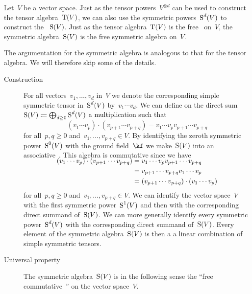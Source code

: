 \begin{recall}
	Let~$V$ be a vector space.
	Just as the tensor powers~$V^{\otimes d}$ can be used to construct the tensor algebra~$\operatorname{T}(V)$, we can also use the symmetric powers~$\operatorname{S}^d(V)$ to construct the ~$\operatorname{S}(V)$.
	Just as the tensor algebra~$\operatorname{T}(V)$ is the free~\algebra{$\kf$} on~$V$, the symmetric algebra~$\operatorname{S}(V)$ is the free symmetric algebra on~$V$.

	The argumentation for the symmetric algebra is analogous to that for the tensor algebra.
	We will therefore skip some of the details.
	
	\begin{description}
		\item[Construction]
			For all vectors~$v_1, \dotsc, v_d$ in~$V$ we denote the corresponding simple symmetric tensor in~$\operatorname{S}^d(V)$ by~$v_1 \dotsm v_d$.
			We can define on the direct sum~$\operatorname{S}(V) \coloneqq \bigoplus_{d \geq 0} \operatorname{S}^d(V)$ a multiplication such that
			\[
				(v_1 \dotsm v_p) \cdot (v_{p+1} \dotsm v_{p+q})
				=
				v_1 \dotsm v_p v_{p+1} \dotsm v_{p+q}
			\]
			for all~$p, q \geq 0$ and~$v_1, \dotsc, v_{p+q} \in V$.
			By identifying the zeroth symmetric power~$\operatorname{S}^0(V)$ with the ground field~$\kf$ we make~$\operatorname{S}(V)$ into an associative~{\algebra{$\kf$}}.
			This algebra is commutative since we have
			\begin{align*}
				\SwapAboveDisplaySkip
				(v_1 \dotsm v_p) \cdot (v_{p+1} \dotsm v_{p+q})
				&=
				v_1 \dotsm v_p v_{p+1} \dotsm v_{p+q}
				\\
				&=
				v_{p+1} \dotsm v_{p+q} v_1 \dotsm v_p
				\\
				&=
				(v_{p+1} \dotsm v_{p+q}) \cdot (v_1 \dotsm v_p)
			\end{align*}
			for all~$p, q \geq 0$ and~$v_1, \dotsc, v_{p+q} \in V$. 
			We can identify the vector space~$V$ with the first symmetric power~$\operatorname{S}^1(V)$ and then with the corresponding direct summand of~$\operatorname{S}(V)$.
			We can more generally identify every symmetric power~$\operatorname{S}^d(V)$ with the corresponding direct summand of~$\operatorname{S}(V)$.
			Every element of the symmetric algebra~$\operatorname{S}(V)$ is then a a linear combination of simple symmetric tensors.
			
		\item[Universal property]
			The symmetric algebra~$\operatorname{S}(V)$ is in the following sense the \enquote{free commutative~{\algebra{$\kf$}}} on the vector space~$V$.


\end{description}
\end{recall}

